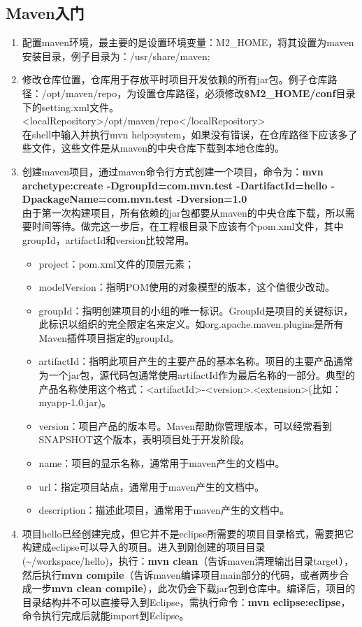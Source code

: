 \subsection{Maven入门}
\begin{enumerate}[(1)]
\item 配置maven环境，最主要的是设置环境变量：M2\_HOME，将其设置为maven安装目录，例子目录为：/usr/share/maven;
\item 修改仓库位置，仓库用于存放平时项目开发依赖的所有jar包。例子仓库路径：/opt/maven/repo，为设置仓库路径，必须修改\textbf{\${M2\_HOME}/conf}目录下的setting.xml文件。\\
<localRepository>/opt/maven/repo</localRepository> \\
在shell中输入并执行mvn help:system，如果没有错误，在仓库路径下应该多了些文件，这些文件是从maven的中央仓库下载到本地仓库的。
\item 创建maven项目，通过maven命令行方式创建一个项目，命令为：\textbf{mvn archetype:create -DgroupId=com.mvn.test -DartifactId=hello -DpackageName=com.mvn.test -Dversion=1.0}\\
由于第一次构建项目，所有依赖的jar包都要从maven的中央仓库下载，所以需要时间等待。做完这一步后，在工程根目录下应该有个pom.xml文件，其中groupId，artifactId和version比较常用。
\begin{itemize}
\item project：pom.xml文件的顶层元素；
\item modelVersion：指明POM使用的对象模型的版本，这个值很少改动。
\item groupId：指明创建项目的小组的唯一标识。GroupId是项目的关键标识，此标识以组织的完全限定名来定义。如org.apache.maven.plugins是所有Maven插件项目指定的groupId。
\item artifactId：指明此项目产生的主要产品的基本名称。项目的主要产品通常为一个jar包，源代码包通常使用artifactId作为最后名称的一部分。典型的产品名称使用这个格式：<artifactId>-<version>.<extension>(比如：myapp-1.0.jar)。
\item version：项目产品的版本号。Maven帮助你管理版本，可以经常看到SNAPSHOT这个版本，表明项目处于开发阶段。
\item name：项目的显示名称，通常用于maven产生的文档中。
\item url：指定项目站点，通常用于maven产生的文档中。
\item description：描述此项目，通常用于maven产生的文档中。
\end{itemize}
\item 项目hello已经创建完成，但它并不是eclipse所需要的项目目录格式，需要把它构建成eclipse可以导入的项目。进入到刚创建的项目目录(\textasciitilde/workspace/hello)，执行：\textbf{mvn clean}（告诉maven清理输出目录target），然后执行\textbf{mvn compile}（告诉maven编译项目main部分的代码，或者两步合成一步\textbf{mvn clean compile}），此次仍会下载jar包到仓库中。编译后，项目的目录结构并不可以直接导入到Eclipse，需执行命令：\textbf{mvn eclipse:eclipse}，命令执行完成后就能import到Eclipse。

\end{enumerate}
